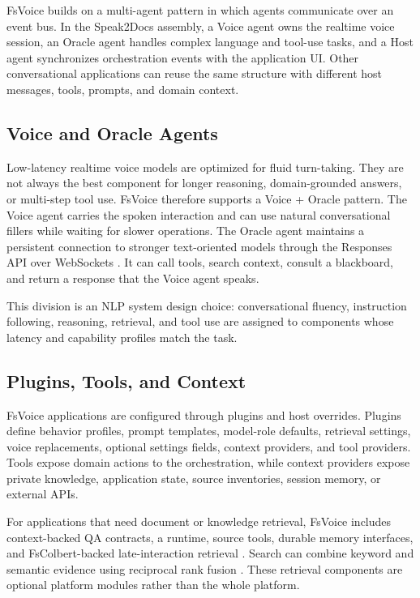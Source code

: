 \documentclass[11pt]{article}
\begin{document}
FsVoice builds on a multi-agent pattern in which agents communicate over an event bus. In the Speak2Docs assembly, a Voice agent owns the realtime voice session, an Oracle agent handles complex language and tool-use tasks, and a Host agent synchronizes orchestration events with the application UI. Other conversational applications can reuse the same structure with different host messages, tools, prompts, and domain context.

\subsection{Voice and Oracle Agents}

Low-latency realtime voice models are optimized for fluid turn-taking. They are not always the best component for longer reasoning, domain-grounded answers, or multi-step tool use. FsVoice therefore supports a Voice + Oracle pattern. The Voice agent carries the spoken interaction and can use natural conversational fillers while waiting for slower operations. The Oracle agent maintains a persistent connection to stronger text-oriented models through the Responses API over WebSockets \citep{openaiResponses}. It can call tools, search context, consult a blackboard, and return a response that the Voice agent speaks.

This division is an NLP system design choice: conversational fluency, instruction following, reasoning, retrieval, and tool use are assigned to components whose latency and capability profiles match the task.

\subsection{Plugins, Tools, and Context}

FsVoice applications are configured through plugins and host overrides. Plugins define behavior profiles, prompt templates, model-role defaults, retrieval settings, voice replacements, optional settings fields, context providers, and tool providers. Tools expose domain actions to the orchestration, while context providers expose private knowledge, application state, source inventories, session memory, or external APIs.

For applications that need document or knowledge retrieval, FsVoice includes context-backed QA contracts, a runtime, source tools, durable memory interfaces, and FsColbert-backed late-interaction retrieval \citep{khattab2020colbert,fscolbert}. Search can combine keyword and semantic evidence using reciprocal rank fusion \citep{cormack2009rrf}. These retrieval components are optional platform modules rather than the whole platform.
\end{document}
